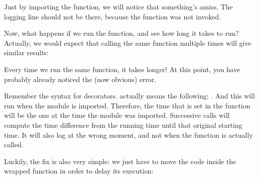 \documentclass[a4paper,10pt,english]{sphinxmanual}
\begin{document}
Just by importing the function, we will notice that something’s amiss. The logging line
should not be there, because the function was not invoked.

Now, what happens if we run the function, and see how long it takes to run? Actually, we
would expect that calling the same function multiple times will give similar results:

\begin{sphinxVerbatim}[commandchars=\\\{\}]
\end{sphinxVerbatim}

Every time we run the same function, it takes longer! At this point, you have probably
already noticed the (now obvious) error.

Remember the syntax for decorators.  actually means the
following: . And this will run when the
module is imported. Therefore, the time that is set in the
function will be the one at the time the module was imported. Successive calls will compute
the time difference from the running time until that original starting time. It will also log at
the wrong moment, and not when the function is actually called.

Luckily, the fix is also very simple: we just have to move the code inside the wrapped
function in order to delay its execution:
\end{document}
